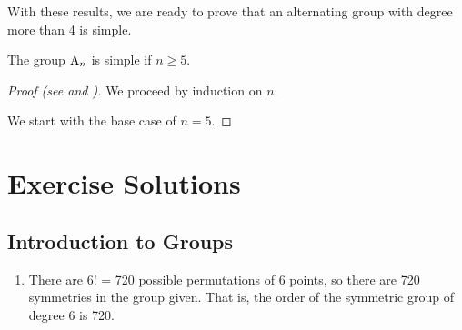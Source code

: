 With these results, we are ready to prove that an alternating group with degree more than 4 is simple.
\begin{theorem}
    The group $\mathrm{A}_{n}$ is simple if $n \geq 5$.
\end{theorem}
\begin{proof}[Proof (see {\cite[p.~4]{conrad_2022}} and {\cite[pp.149-150]{dummit_foote_2004}})]
    We proceed by induction on $n$.

    We start with the base case of $n = 5$.
\end{proof}

\appendix
\chapter{Exercise Solutions}

\section{Introduction to Groups}
\begin{enumerate}
    \item There are 6! = 720 possible permutations of 6 points, so there are 720 symmetries in the group given. That is, the order of the symmetric group of degree 6 is 720.
\end{enumerate}

